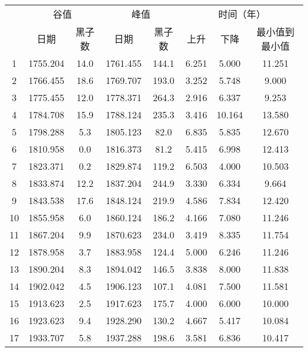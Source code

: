 \begin{table}[!htbp]
  \centering
  \label{tab:ss_max_min}
  \footnotesize
  \renewcommand{\arraystretch}{1}
  \begin{tabular}{cccccccc}
    \toprule
    \multicolumn{1}{c}{}&\multicolumn{2}{c}{谷值}&
    \multicolumn{2}{c}{峰值}& \multicolumn{3}{c}{时间（年）}\\
    \cmidrule(lr){2-3} \cmidrule(lr){4-5} \cmidrule(lr){6-8} \noalign{\smallskip}
    \multicolumn{1}{c}{太阳周} & 日期 & 黑子数 & 日期 & 黑子数 & 上升 & 下降 & 最小值到最小值\\ 
    \midrule 
    1 & 1755.204 & 14.0 & 1761.455 & 144.1 & 6.251 & 5.000 & 11.251 \\
    2 & 1766.455 & 18.6 & 1769.707 & 193.0 & 3.252 & 5.748 & 9.000 \\
    3 & 1775.455 & 12.0 & 1778.371 & 264.3 & 2.916 & 6.337 & 9.253 \\
    4 & 1784.708 & 15.9 & 1788.124 & 235.3 & 3.416 & 10.164 & 13.580 \\
    5 & 1798.288 & 5.3 & 1805.123 & 82.0 & 6.835 & 5.835 & 12.670 \\
    6 & 1810.958 & 0.0 & 1816.373 & 81.2 & 5.415 & 6.998 & 12.413 \\
    7 & 1823.371 & 0.2 & 1829.874 & 119.2 & 6.503 & 4.000 & 10.503 \\
    8 & 1833.874 & 12.2 & 1837.204 & 244.9 & 3.330 & 6.334 & 9.664 \\
    9 & 1843.538 & 17.6 & 1848.124 & 219.9 & 4.586 & 7.834 & 12.420 \\
    10 & 1855.958 & 6.0 & 1860.124 & 186.2 & 4.166 & 7.080 & 11.246 \\
    11 & 1867.204 & 9.9 & 1870.623 & 234.0 & 3.419 & 8.335 & 11.754 \\
    12 & 1878.958 & 3.7 & 1883.958 & 124.4 & 5.000 & 6.246 & 11.246 \\
    13 & 1890.204 & 8.3 & 1894.042 & 146.5 & 3.838 & 8.000 & 11.838 \\
    14 & 1902.042 & 4.5 & 1906.123 & 107.1 & 4.081 & 7.500 & 11.581 \\
    15 & 1913.623 & 2.5 & 1917.623 & 175.7 & 4.000 & 6.000 & 10.000 \\
    16 & 1923.623 & 9.4 & 1928.290 & 130.2 & 4.667 & 5.417 & 10.084 \\
    17 & 1933.707 & 5.8 & 1937.288 & 198.6 & 3.581 & 6.836 & 10.417 \\

\end{tabular}
\end{table}
